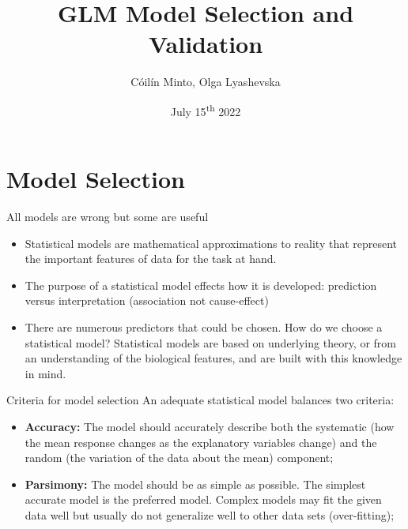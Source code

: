 \documentclass{beamer}
\title{GLM Model Selection and Validation}
\author{Cóilín Minto, Olga Lyashevska}
\date{July 15\textsuperscript{th} 2022}
\institute{Marine and Freshwater Research Centre\\ Atlantic Technological University \\ Galway, Ireland}
\begin{document}
\begin{frame}
 \maketitle
\end{frame}

\section{Model Selection}


\begin{frame}{All models are wrong but some are useful}{}

\begin{itemize}
\item Statistical models are mathematical approximations to reality that represent the important features of data for the
task at hand.
\pause
\item The purpose of a statistical model effects how it is developed: prediction versus interpretation (association not cause-effect)
\pause
\item There are numerous predictors that could be chosen. How do we choose a statistical model? Statistical models are based on underlying theory, or from an understanding of the biological features, and are built with this knowledge in mind. 
\end{itemize}

\end{frame}

\begin{frame}{Criteria for model selection}{}
An adequate statistical model balances two criteria:
\begin{itemize}
\item \textbf{Accuracy:} The model should accurately describe both the systematic (how the mean response changes as the explanatory variables change) and the random  (the variation of the data about the mean) component;  
\pause
\item \textbf{Parsimony:} The model should be as simple as possible. The simplest accurate model is the preferred model. Complex models may fit the given data well but usually do not generalize well to other data sets (over-fitting);
\end{itemize}
\end{frame}
\end{document}
